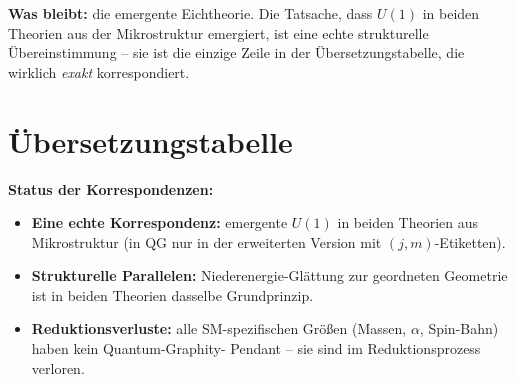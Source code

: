 \textbf{Was bleibt:} die emergente Eichtheorie. Die Tatsache, dass
$U(1)$ in beiden Theorien aus der Mikrostruktur emergiert, ist eine
echte strukturelle Übereinstimmung -- sie ist die einzige Zeile in
der Übersetzungstabelle, die wirklich \emph{exakt} korrespondiert.

\section{Übersetzungstabelle}

\begin{center}
\renewcommand{\arraystretch}{1.4}
{\small
{}
}
\renewcommand{\arraystretch}{1.0}
\end{center}

\textbf{Status der Korrespondenzen:}
\begin{itemize}[leftmargin=2em,itemsep=2pt,topsep=2pt]
  \item \textbf{Eine echte Korrespondenz:} emergente $U(1)$ in beiden
        Theorien aus Mikrostruktur (in QG nur in der erweiterten
        Version mit $(j, m)$-Etiketten).
  \item \textbf{Strukturelle Parallelen:} Niederenergie-Glättung zur
        geordneten Geometrie ist in beiden Theorien dasselbe
        Grundprinzip.
  \item \textbf{Reduktionsverluste:} alle SM-spezifischen Größen
        (Massen, $\alpha$, Spin-Bahn) haben kein Quantum-Graphity-
        Pendant -- sie sind im Reduktionsprozess verloren.
\end{itemize}

